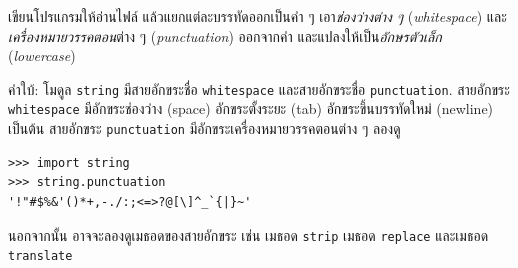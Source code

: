 \begin{exercise}


เขียนโปรแกรมให้อ่านไฟล์ แล้วแยกแต่ละบรรทัดออกเป็นคำ ๆ 
เอา\textit{ช่องว่างต่าง ๆ} (\textit{whitespace}) และ\textit{เครื่องหมายวรรคตอน}ต่าง ๆ (\textit{punctuation}) ออกจากคำ
และแปลงให้เป็น\textit{อักษรตัวเล็ก} (\textit{lowercase})



คำใบ้: โมดูล \texttt{string} มีสายอักขระชื่อ \texttt{whitespace}
และสายอักขระชื่อ \texttt{punctuation}.
สายอักขระ \texttt{whitespace} มีอักขระช่องว่าง (space) อักขระตั้งระยะ (tab) อักขระขึ้นบรรทัดใหม่ (newline) เป็นต้น
สายอักขระ \texttt{punctuation}  มีอักขระเครื่องหมายวรรคตอนต่าง ๆ
ลองดู %

\begin{verbatim}
>>> import string
>>> string.punctuation
'!"#$%&'()*+,-./:;<=>?@[\]^_`{|}~'
\end{verbatim}
%
%
นอกจากนั้น อาจจะลองดูเมธอดของสายอักขระ เช่น เมธอด \texttt{strip} เมธอด \texttt{replace} และเมธอด \texttt{translate}
%
\\
\end{exercise}


